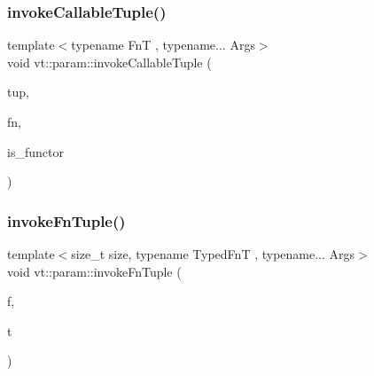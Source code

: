 \mbox{\label{namespacevt_1_1param_abf08d95b32c6ee59c63fd63d77a71bae}} 
\subsubsection{\texorpdfstring{invoke\+Callable\+Tuple()}{invokeCallableTuple()}}
{\footnotesize\ttfamily template$<$typename FnT , typename... Args$>$ \\
void vt\+::param\+::invoke\+Callable\+Tuple (\begin{DoxyParamCaption}\item[{std\+::tuple$<$ Args... $>$ \&\&}]{tup,  }\item[{FnT}]{fn,  }\item[{bool const \&}]{is\+\_\+functor }\end{DoxyParamCaption})}

\mbox{\label{namespacevt_1_1param_a568981462cb51bb976f0a07945611b0b}} 
\subsubsection{\texorpdfstring{invoke\+Fn\+Tuple()}{invokeFnTuple()}}
{\footnotesize\ttfamily template$<$size\+\_\+t size, typename Typed\+FnT , typename... Args$>$ \\
void vt\+::param\+::invoke\+Fn\+Tuple (\begin{DoxyParamCaption}\item[{Typed\+FnT}]{f,  }\item[{std\+::tuple$<$ Args... $>$ \&\&}]{t }\end{DoxyParamCaption})}

